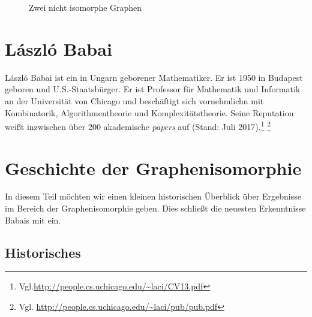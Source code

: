\documentclass[a4paper]{article}
\newcommand{\babai}{\url{http://people.cs.uchicago.edu/~laci/CV13.pdf}}
\newcommand{\babaipublications}{\url{http://people.cs.uchicago.edu/~laci/pub/pub.pdf}}
\begin{document}
\begin{figure}
\centering
{}
  \caption{Zwei nicht isomorphe Graphen}\label{fig:nisomorph}
  \end{figure}



\section{L\'{a}szl\'{o} Babai}
L\'{a}szl\'{o} Babai ist ein in Ungarn geborener Mathematiker. Er ist 1950 in Budapest geboren und U.S.-Staatsbürger. Er ist Professor für Mathematik und Informatik an der Universität von Chicago und beschäftigt sich vornehmlichn mit Kombinatorik, Algorithmentheorie und Komplexitätstheorie. Seine Reputation weißt inzwischen über 200 akademische \emph{papers} auf (Stand: Juli 2017).\footnote{Vgl.\hspace{0.1cm}\babai} \footnote{Vgl. \babaipublications}

\section{Geschichte der Graphenisomorphie} \label{sec:historical}

In diesem Teil möchten wir einen kleinen historischen Überblick über Ergebnisse im Bereich der Graphenisomorphie geben. Dies schließt die neuesten Erkenntnisse Babais mit ein.
\subsection{Historisches}
\end{document}
